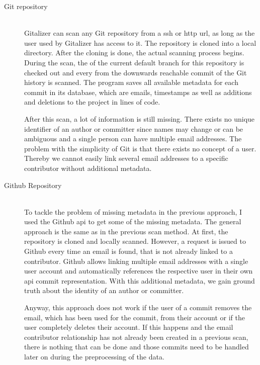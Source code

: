 \begin{description}
    \item[Git repository]\label{stand-alone-repository-scan} \hfill \\
        Gitalizer can scan any Git repository from a \ac{ssh} or \ac{http} \acs{url}, as long as the user used by Gitalizer has access to it.
        The repository is cloned into a local directory.
        After the cloning is done, the actual scanning process begins.
        During the scan, the  of the current default branch for this repository is checked out and every from the  downwards reachable commit of the Git history is scanned.
        The program saves all available metadata for each commit in its database, which are emails, timestamps as well as additions and deletions to the project in lines of code.

        After this scan, a lot of information is still missing.
        There exists no unique identifier of an author or committer since names may change or can be ambiguous and a single person can have multiple email addresses.
        The problem with the simplicity of Git is that there exists no concept of a user.
        Thereby we cannot easily link several email addresses to a specific contributor without additional metadata.


    \item[Github Repository]\label{github-repo-scan} \hfill \\
        To tackle the problem of missing metadata in the previous approach, I used the Github \ac{api} to get some of the missing metadata.
        The general approach is the same as in the previous scan method.
        At first, the repository is cloned and locally scanned.
        However, a request is issued to Github every time an email is found, that is not already linked to a contributor.
        Github allows linking multiple email addresses with a single user account and automatically references the respective user in their own \ac{api} commit representation.
        With this additional metadata, we gain ground truth about the identity of an author or committer.

        Anyway, this approach does not work if the user of a commit removes the email, which has been used for the commit, from their account or if the user completely deletes their account.
        If this happens and the email contributor relationship has not already been created in a previous scan, there is nothing that can be done and those commits need to be handled later on during the preprocessing of the data.


\end{description}

